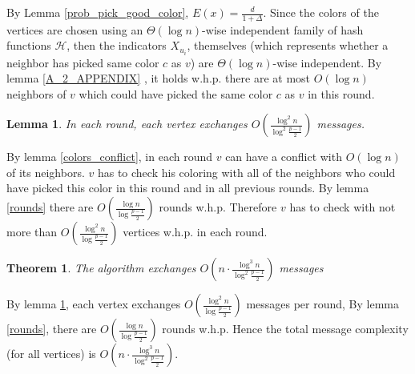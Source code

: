 \documentclass[11pt]{article}
\newtheorem{theorem}{Theorem}
\newtheorem{lemma}{Lemma}
\begin{document}
By Lemma \ref{prob_pick_good_color}, $E(x) = \frac{d}{1 + \Delta}$. Since the colors of the vertices are chosen using an $\Theta(\log{n})$-wise independent family of hash functions $\mathcal{H}$, then the indicators $X_{u_i}$, themselves (which represents whether a neighbor has picked same color $c$ as $v$) are $\Theta(\log{n})$-wise independent. By lemma \ref{A_2_APPENDIX} , it holds w.h.p. there are at most $O(\log{n})$ neighbors of $v$ which could have picked the same color $c$ as $v$ in this round. 

\begin{lemma}
\label{message_per_round}
In each round, each vertex exchanges $O(\frac{\log^2{n}}{\log^2{\frac{p-1}{2}}})$ messages.
\end{lemma}
By lemma \ref{colors_conflict}, in each round $v$ can have a conflict with $O(\log{n})$ of its neighbors. $v$ has to check his coloring with all of the neighbors who could have picked this color in this round and in all previous rounds. By lemma \ref{rounds} there are $O(\frac{\log{n}}{\log{\frac{p-1}{2}}})$ rounds w.h.p. Therefore $v$ has to check with not more than $O(\frac{\log^2{n}}{\log{\frac{p-1}{2}}})$ vertices w.h.p. in each round.


\begin{theorem}
The algorithm exchanges $O(n\cdot \frac{\log^3{n}}{\log^2{\frac{p-1}{2}}})$ messages
\end{theorem}
By lemma \ref{message_per_round}, each vertex exchanges $O(\frac{\log^2{n}}{\log{\frac{p-1}{2}}})$ messages per round, By lemma \ref{rounds}, there are $O(\frac{\log{n}}{\log{\frac{p-1}{2}}})$ rounds w.h.p. Hence the total message complexity (for all vertices) is $O(n\cdot \frac{\log^3{n}}{\log^2{\frac{p-1}{2}}})$.
\newline
\newline
\end{document}
